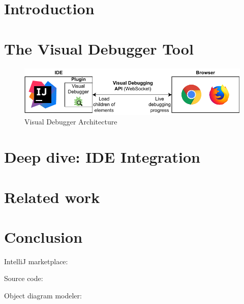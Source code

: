 \documentclass[sigconf]{acmart}
\begin{document}

\maketitle

\section{Introduction}
\cite{krauterVisualDebuggerTool2022}
\section{The Visual Debugger Tool}
\cite{krauterVisualDebuggerTool2022}

\begin{figure}[ht]
  \centering
  \includegraphics[width=\linewidth]{images/VD-architecture.pdf}
  \caption{Visual Debugger Architecture}
\end{figure}
\section{Deep dive: IDE Integration}
\section{Related work}
\section{Conclusion}

IntelliJ marketplace: \cite{timkrauterVisualDebuggerIntelliJ2023}

Source code: \cite{timkrauterVisualDebuggerTool2023}

Object diagram modeler: \cite{timkrauterObjectDiagramModeler2023}




\end{document}
